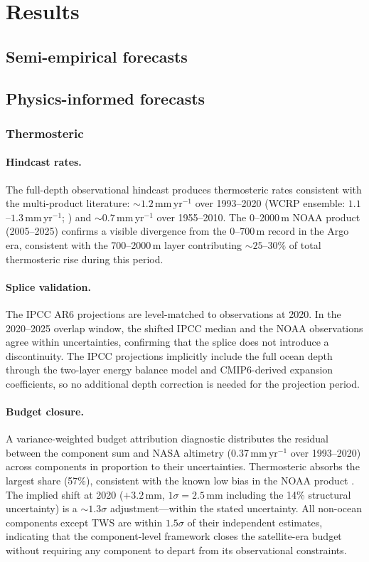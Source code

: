 \documentclass[11pt]{article}
\begin{document}
\section{Results}

\subsection{Semi-empirical forecasts}

\subsection{Physics-informed forecasts}
	\subsubsection{Thermosteric}

\paragraph{Hindcast rates.}
The full-depth observational hindcast produces thermosteric rates consistent with the multi-product literature: $\sim\!1.2$\,mm\,yr$^{-1}$ over 1993--2020 (WCRP ensemble: $1.1$--$1.3$\,mm\,yr$^{-1}$; \citealp{vonSchuckmann2023}) and $\sim\!0.7$\,mm\,yr$^{-1}$ over 1955--2010. The 0--2000\,m NOAA product (2005--2025) confirms a visible divergence from the 0--700\,m record in the Argo era, consistent with the 700--2000\,m layer contributing $\sim\!25$--$30\%$ of total thermosteric rise during this period.

\paragraph{Splice validation.}
The IPCC AR6 projections are level-matched to observations at 2020. In the 2020--2025 overlap window, the shifted IPCC median and the NOAA observations agree within uncertainties, confirming that the splice does not introduce a discontinuity. The IPCC projections implicitly include the full ocean depth through the two-layer energy balance model and CMIP6-derived expansion coefficients, so no additional depth correction is needed for the projection period.

\paragraph{Budget closure.}
A variance-weighted budget attribution diagnostic distributes the residual between the component sum and NASA altimetry (0.37\,mm\,yr$^{-1}$ over 1993--2020) across components in proportion to their uncertainties. Thermosteric absorbs the largest share (57\%), consistent with the known low bias in the NOAA product \citep{Li2022}. The implied shift at 2020 ($+3.2$\,mm, $1\sigma = 2.5$\,mm including the 14\% structural uncertainty) is a $\sim\!1.3\sigma$ adjustment---within the stated uncertainty. All non-ocean components except TWS are within $1.5\sigma$ of their independent estimates, indicating that the component-level framework closes the satellite-era budget without requiring any component to depart from its observational constraints.
\end{document}
